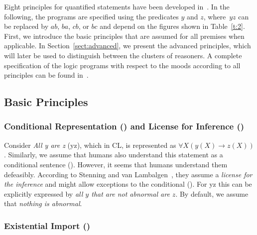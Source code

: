 \documentclass[12pt]{article}
\begin{document}
Eight principles for quantified statements have been developed in~\cite{cogsci:2017,costa:dietz:Hoelldobler:2017,declare:2017}.
In the following, the programs are
specified using the predicates $y$ and $z$, where~$yz$ can be replaced by $ab$, $ba$, $cb$, or $bc$ and depend on the figures shown in Table~\ref{t:2}. First, we introduce the basic principles that are assumed for all premises when applicable.
In Section~\ref{sect:advanced}, we present the advanced principles, which will 
later be used to distinguish between the clusters of reasoners.
A complete specification of the logic programs with respect to the moods according to all principles can be found in~\cite{declare:2017}.

\subsection{Basic Principles}   \label{sect:basic}

\subsubsection{Conditional Representation (\conditionals) and License for Inference (\licenses)}\label{sect:condli}
Consider \textit{All y are z} ({\MA yz}), which in CL, is represented as $\forall X (y(X) \rightarrow z(X))$.
Similarly, we assume that humans also understand this statement as a conditional sentence (\conditionals).
However, it seems that humans understand them defeasibly. According to Stenning and van Lambalgen~\cite{stenning:vanlambalgen:2008}, they assume a \textit{license for the inference} and might allow exceptions to the conditional (\licenses). For \MA yz this can be 
explicitly expressed by 
\textit{all $y$ that are not abnormal are $z$}.
By default, we assume that \textit{nothing is abnormal}. %

\subsubsection{Existential Import ()}
\end{document}
